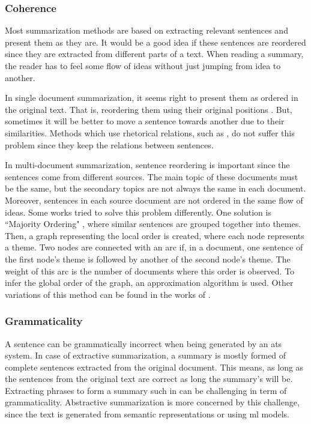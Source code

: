 \subsubsection{Coherence}

Most summarization methods are based on extracting relevant sentences and present them as they are. 
It would be a good idea if these sentences are reordered since they are extracted from different parts of a text. 
When reading a summary, the reader has to feel some flow of ideas without just jumping from idea to another.

In single document summarization, it seems right to present them as ordered in the original text. 
That is, reordering them using their original positions \citep{99-mckeown-al,00-radev-al,02-lin-hovy}. 
But, sometimes it will be better to move a sentence towards another due to their similarities. 
Methods which use rhetorical relations, such as \citep{98-marcu}, do not suffer this problem since they keep the relations between sentences.

In multi-document summarization, sentence reordering is important since the sentences come from different sources. 
The main topic of these documents must be the same, but the secondary topics are not always the same in each document.
Moreover, sentences in each source document are not ordered in the same flow of ideas. 
Some works tried to solve this problem differently. 
One solution is ``Majority Ordering" \citep{02-barzilay-al}, where similar sentences are grouped together into themes. 
Then, a graph representing the local order is created, where each node represents a theme. 
Two nodes are connected with an arc if, in a document, one sentence of the first node's theme is followed by another of the second node's theme.
The weight of this arc is the number of documents where this order is observed.
To infer the global order of the graph, an approximation algorithm is used.
Other variations of this method can be found in the works of \citet{05-bollegala-al,08-ji-nie}.

\subsubsection{Grammaticality}

A sentence can be grammatically incorrect when being generated by an \ac{ats} system. 
In case of extractive summarization, a summary is mostly formed of complete sentences extracted from the original document. 
This means, as long as the sentences from the original text are correct as long the summary's will be. 
Extracting phrases to form a summary such in \citep{18-gehrmann-al} can be challenging in term of grammaticality. 
Abstractive summarization is more concerned by this challenge, since the text is generated from semantic representations or using \ac{ml} models. 

